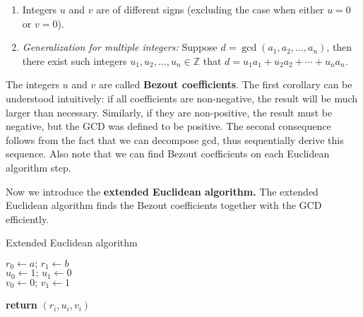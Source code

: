 \documentclass[../lecture-notes-148x210.tex]{subfiles}
\begin{document}
\begin{corollary} 
    \hfill
    \begin{enumerate}
        \item Integers $u$ and $v$ are of different signs (excluding the case when either $u=0$ or $v=0$).
        \item \textit{Generalization for multiple integers:} Suppose $d = \gcd(a_1, a_2, \dots, a_n)$, then there exist such integers $u_1, u_2, \dots, u_n \in \mathbb{Z}$ that $d = u_1 a_1 + u_2 a_2 + \cdots + u_n a_n$.
    \end{enumerate}    
\end{corollary}

The integers $u$ and $v$ are called \textbf{Bezout coefficients}. The first
corollary can be understood intuitively: if all coefficients are non-negative,
the result will be much larger than necessary. Similarly, if they are
non-positive, the result must be negative, but the GCD was defined to be
positive. The second consequence follows from the fact that we can decompose
gcd, thus sequentially derive this sequence. Also note that we can find Bezout
coefficients on each Euclidean algorithm step.

Now we introduce the \textbf{extended Euclidean algorithm.} The extended
Euclidean algorithm finds the Bezout coefficients together with the GCD
efficiently.

\begin{algorithm}[H]
    \caption{Extended Euclidean algorithm} \label{alg:extended_euclidean}
        
    $r_{0} \gets a; \, r_{1} \gets b$ \\
    $u_{0} \gets 1; \, u_{1} \gets 0$ \\
    $v_{0} \gets 0; \, v_{1} \gets 1$ \\


    \textbf{return} $(r_i, u_i, v_i)$
\end{algorithm}
\end{document}
